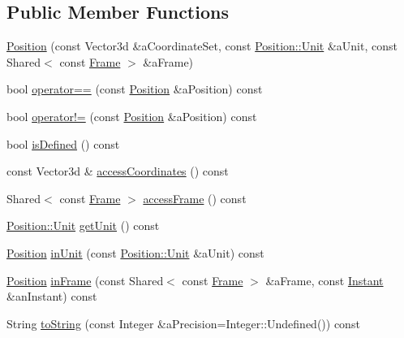 \subsection*{Public Member Functions}
\begin{DoxyCompactItemize}
\item 
\hyperlink{classlibrary_1_1physics_1_1coord_1_1_position_a68bead4a5057939ee5b6e77d2a8aa446}{Position} (const Vector3d \&a\+Coordinate\+Set, const \hyperlink{classlibrary_1_1physics_1_1units_1_1_length_a3b8b39cd245cf6b19dc34459baeccb18}{Position\+::\+Unit} \&a\+Unit, const Shared$<$ const \hyperlink{classlibrary_1_1physics_1_1coord_1_1_frame}{Frame} $>$ \&a\+Frame)
\item 
bool \hyperlink{classlibrary_1_1physics_1_1coord_1_1_position_a520bfdf64e8f45f60e815ebc72012fde}{operator==} (const \hyperlink{classlibrary_1_1physics_1_1coord_1_1_position}{Position} \&a\+Position) const
\item 
bool \hyperlink{classlibrary_1_1physics_1_1coord_1_1_position_a78524e4b9328853ca6266defbe61fc7e}{operator!=} (const \hyperlink{classlibrary_1_1physics_1_1coord_1_1_position}{Position} \&a\+Position) const
\item 
bool \hyperlink{classlibrary_1_1physics_1_1coord_1_1_position_ac13492ffe13b093bb26173089db1a24b}{is\+Defined} () const
\item 
const Vector3d \& \hyperlink{classlibrary_1_1physics_1_1coord_1_1_position_abbcef57299f3416b88c458ea6bcd24e5}{access\+Coordinates} () const
\item 
Shared$<$ const \hyperlink{classlibrary_1_1physics_1_1coord_1_1_frame}{Frame} $>$ \hyperlink{classlibrary_1_1physics_1_1coord_1_1_position_a26c1f0eba51a3441106367eac1827455}{access\+Frame} () const
\item 
\hyperlink{classlibrary_1_1physics_1_1units_1_1_length_a3b8b39cd245cf6b19dc34459baeccb18}{Position\+::\+Unit} \hyperlink{classlibrary_1_1physics_1_1coord_1_1_position_a1b6173fd9226069e36ac075b444be794}{get\+Unit} () const
\item 
\hyperlink{classlibrary_1_1physics_1_1coord_1_1_position}{Position} \hyperlink{classlibrary_1_1physics_1_1coord_1_1_position_a908878d741ad2de6a2d278d2d674e949}{in\+Unit} (const \hyperlink{classlibrary_1_1physics_1_1units_1_1_length_a3b8b39cd245cf6b19dc34459baeccb18}{Position\+::\+Unit} \&a\+Unit) const
\item 
\hyperlink{classlibrary_1_1physics_1_1coord_1_1_position}{Position} \hyperlink{classlibrary_1_1physics_1_1coord_1_1_position_af8dcfe9e1f9e172d2123ab38cd7b30c8}{in\+Frame} (const Shared$<$ const \hyperlink{classlibrary_1_1physics_1_1coord_1_1_frame}{Frame} $>$ \&a\+Frame, const \hyperlink{classlibrary_1_1physics_1_1time_1_1_instant}{Instant} \&an\+Instant) const
\item 
String \hyperlink{classlibrary_1_1physics_1_1coord_1_1_position_ab88010154fdbcb36b0e25b3986bcc80c}{to\+String} (const Integer \&a\+Precision=Integer\+::\+Undefined()) const
\end{DoxyCompactItemize}
